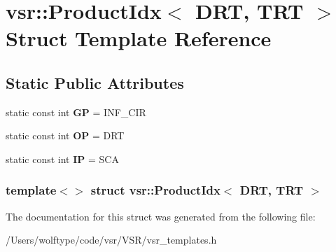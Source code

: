 \hypertarget{structvsr_1_1_product_idx_3_01_d_r_t_00_01_t_r_t_01_4}{\section{vsr\-:\-:Product\-Idx$<$ D\-R\-T, T\-R\-T $>$ Struct Template Reference}
\label{structvsr_1_1_product_idx_3_01_d_r_t_00_01_t_r_t_01_4}
}
\subsection*{Static Public Attributes}
\begin{DoxyCompactItemize}
\item 
\hypertarget{structvsr_1_1_product_idx_3_01_d_r_t_00_01_t_r_t_01_4_aad2f3aef52ab7707691ad53ff4d5c446}{static const int {\bfseries G\-P} = I\-N\-F\-\_\-\-C\-I\-R}\label{structvsr_1_1_product_idx_3_01_d_r_t_00_01_t_r_t_01_4_aad2f3aef52ab7707691ad53ff4d5c446}

\item 
\hypertarget{structvsr_1_1_product_idx_3_01_d_r_t_00_01_t_r_t_01_4_a6cb35bb3f80270c6864835aa9c6beb53}{static const int {\bfseries O\-P} = D\-R\-T}\label{structvsr_1_1_product_idx_3_01_d_r_t_00_01_t_r_t_01_4_a6cb35bb3f80270c6864835aa9c6beb53}

\item 
\hypertarget{structvsr_1_1_product_idx_3_01_d_r_t_00_01_t_r_t_01_4_a7aeb4743c9e58cef8c70be2a9c5b9e95}{static const int {\bfseries I\-P} = S\-C\-A}\label{structvsr_1_1_product_idx_3_01_d_r_t_00_01_t_r_t_01_4_a7aeb4743c9e58cef8c70be2a9c5b9e95}

\end{DoxyCompactItemize}
\subsubsection*{template$<$$>$ struct vsr\-::\-Product\-Idx$<$ D\-R\-T, T\-R\-T $>$}



The documentation for this struct was generated from the following file\-:\begin{DoxyCompactItemize}
\item 
/\-Users/wolftype/code/vsr/\-V\-S\-R/vsr\-\_\-templates.\-h\end{DoxyCompactItemize}
